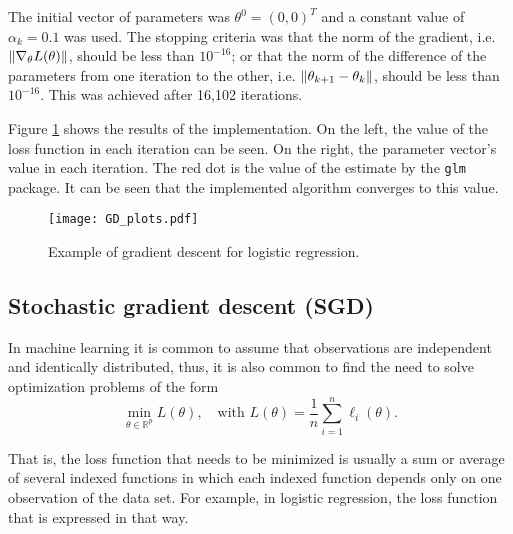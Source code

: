 The initial vector of parameters was $\theta^0 = (0, 0)^T$ and a constant value of $\alpha_k = 0.1$ was used. The stopping criteria was that the norm of the gradient, i.e. $\left\lVert \nabla_{\theta} L(\theta) \right\rVert$, should be less than $10^{-16}$; or that the norm of the difference of the parameters from one iteration to the other, i.e. $\left\lVert \theta_{k+1} - \theta_k \right\rVert$, should be less than $10^{-16}$. This was achieved after 16,102 iterations.

Figure \ref{fig:GD_plots} shows the results of the implementation. On the left, the value of the loss function in each iteration can be seen. On the right, the parameter vector's value in each iteration. The red dot is the value of the estimate by the \texttt{glm} package. It can be seen that the implemented algorithm converges to this value.

\begin{figure}[H]
    \centering
    \texttt{[image: GD\_plots.pdf]}
    \caption{Example of gradient descent for logistic regression.}
    \label{fig:GD_plots}
\end{figure}

\subsection{Stochastic gradient descent (SGD)}

In machine learning it is common to assume that observations are independent and identically distributed, thus, it is also common to find the need to solve optimization problems of the form
\begin{equation}
  \min_{\theta \in \mathbb{R}^p} L(\theta), \quad \text{with} \, \,
  L(\theta) = \frac{1}{n} \sum_{i = 1}^n { \ell_i(\theta) }.
\end{equation}

That is, the loss function that needs to be minimized is usually a sum or average of several indexed functions in which each indexed function depends only on one observation of the data set. For example, in logistic regression, the loss function that is expressed in that way.

